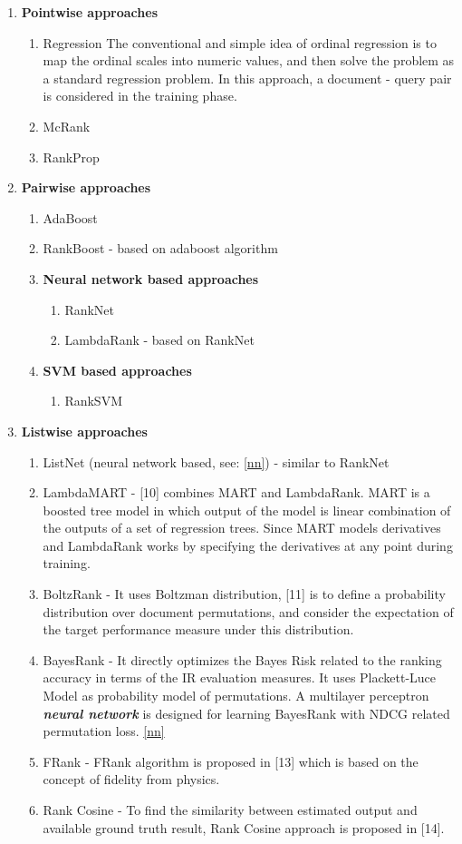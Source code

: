 \documentclass[]{article}
\begin{document}
\begin{enumerate}
\item \textbf{Pointwise approaches}
	\begin{enumerate}
	\item Regression
	The conventional and simple idea of ordinal regression is to map the ordinal scales into numeric values, and then solve the problem as a standard regression problem. In this approach, a document - query pair is considered in the training phase.
	\item McRank
	\item RankProp
	\end{enumerate}
\item \textbf{Pairwise approaches}
	\begin{enumerate}
	\item AdaBoost
	\item RankBoost - 
	based on adaboost algorithm
	\item \textbf{Neural network based approaches} \label{nn}
	\begin{enumerate}
	\item RankNet
	\item LambdaRank - based on RankNet
	\end{enumerate}
	\item \textbf{SVM based approaches}
	\begin{enumerate}
	\item RankSVM \cite{15}
	\end{enumerate}
	\end{enumerate}
\item \textbf{Listwise approaches}
	\begin{enumerate}
	\item ListNet (neural network based, see: \ref{nn}) - similar to RankNet
	\item LambdaMART - [10] combines MART and 	LambdaRank. MART is a boosted tree model in which output of the model is linear combination of the outputs of a set of regression trees. Since MART models derivatives and LambdaRank works by specifying the derivatives at any
	point during training.
	\item BoltzRank - It uses Boltzman distribution, [11] is to define a probability distribution over document 	permutations, and consider the expectation of the target performance measure under this distribution.
	\item BayesRank - It directly optimizes the Bayes Risk related to the ranking accuracy in terms of the IR evaluation measures. It uses Plackett-Luce Model as probability model of permutations. A multilayer perceptron \textit{\textbf{neural network}} is designed for learning BayesRank with NDCG related permutation loss. \ref{nn}
	\item FRank - FRank algorithm is proposed in [13] which is based on the concept of fidelity from physics.
	
	\item Rank Cosine - To find the similarity between estimated output and available ground truth result, Rank Cosine approach is proposed in [14].
	\end{enumerate}
\end{enumerate}
\end{document}
